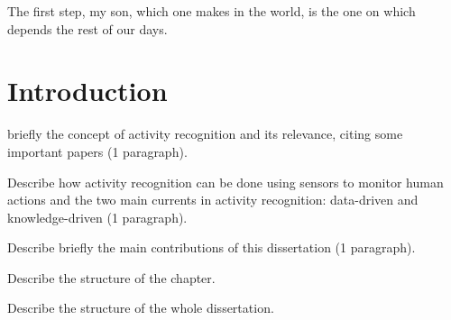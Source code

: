 



\begin{savequote}[50mm]
The first step, my son, which one makes in the world, is the one on which depends the rest of our days.
\end{savequote}

\chapter{Introduction}
\label{cha:introduction}

\ifpdf
    \graphicspath{{1_introduction/figures/PDF/}{1_introduction/figures/PNG/}{1_introduction/figures/}}
\else
    \graphicspath{{1_introduction/figures/EPS/}{1_introduction/figures/}}
\fi

\sloppy {} briefly the concept of activity recognition and its relevance, citing some important papers (1 paragraph). 

Describe how activity recognition can be done using sensors to monitor human actions and the two main currents in activity recognition: data-driven and knowledge-driven (1 paragraph).

Describe briefly the main contributions of this dissertation (1 paragraph).

Describe the structure of the chapter.


Describe the structure of the whole dissertation.


